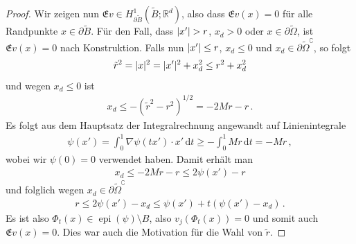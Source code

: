 \documentclass{scrartcl}
\def\R{\mathbb{R}}
\newcommand{\tiOmega}{\tilde{\Omega}}
\newcommand{\tir}{\tilde{r}}
\newcommand{\tiB}{\tilde{B}}
\newcommand{\erw}{\mathfrak{E}}			%
\newcommand{\dif}[1]{\,\mathrm{d} #1}
\DeclareMathOperator{\epi}{epi}			%
\DeclarePairedDelimiter{\abs}{\lvert}{\rvert}
\begin{document}
\begin{proof}
	Wir zeigen nun $\erw v\in H^1_{\partial \tiB}(\tiB;\R^d)$, also dass $\erw v(x)=0$ für alle Randpunkte $x\in\partial \tiB$.
	Für den Fall, dass $\abs{x'}>r$, $x_d>0$ oder $x\in\partial\tiOmega$, ist $\erw v(x) = 0$ nach Konstruktion.
	Falls nun $\abs{x'}\leq r$, $x_d\leq0$ und $x_d\in\partial\tiOmega^\complement$, so folgt
	\begin{align*}
		\tir^2 = \abs{x}^2 = \abs{x'}^2+x_d^2\leq r^2+x_d^2
	\end{align*}
	und wegen $x_d\leq0$ ist 
	\begin{align*}
		x_d\leq -\left(\tir^2-r^2\right)^{1/2}= -2Mr-r\,.
	\end{align*}
	Es folgt aus dem Hauptsatz der Integralrechnung angewandt auf Linienintegrale
	\begin{align*}
		\psi(x')=\int_0^1 \nabla\psi(tx')\cdot x'\dif t\geq -\int_0^1Mr\dif t= -Mr\,,
	\end{align*}
	wobei wir $\psi(0)=0$ verwendet haben. Damit erhält man
	\begin{align*}
		x_d\leq -2Mr-r \leq 2\psi(x')-r
	\end{align*}
	und folglich wegen $x_d\in\partial\tiOmega^\complement$
	\begin{align*}
		r\leq 2\psi(x')-x_d\leq \psi(x')+t(\psi(x')-x_d)\,.
	\end{align*}
	Es ist also $\Phi_t(x)\in\epi(\psi)\setminus B$, also $v_j(\Phi_t(x))=0$ und somit auch $\erw v(x) = 0$. Dies war auch die Motivation für die Wahl von $\tir$.
	

\end{proof}
\end{document}
